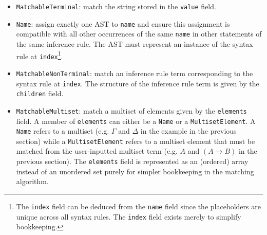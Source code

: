 \begin{itemize}
    \item \lstinline{MatchableTerminal}: match the string stored in the \lstinline{value} field.
    \item \lstinline{Name}: assign exactly one AST to \lstinline{name} and ensure this assignment is compatible with all other occurrences of the same \lstinline{name} in other statements of the same inference rule. The AST must represent an instance of the syntax rule at \lstinline{index}\footnote{The \lstinline{index} field can be deduced from the \lstinline{name} field since the placeholders are unique across all syntax rules. The \lstinline{index} field exists merely to simplify bookkeeping.}.
    \item \lstinline{MatchableNonTerminal}: match an inference rule term corresponding to the syntax rule at \lstinline{index}. The structure of the inference rule term is given by the \lstinline{children} field.
    \item \lstinline{MatchableMultiset}: match a multiset of elements given by the \lstinline{elements} field. A member of \lstinline{elements} can either be a \lstinline{Name} or a \lstinline{MultisetElement}. A \lstinline{Name} refers to a multiset (e.g. $\Gamma$ and $\Delta$ in the example in the previous section) while a \lstinline{MultisetElement} refers to a multiset element that must be matched from the user-inputted multiset term (e.g. $A$ and $(A \to B)$ in the previous section). The \lstinline{elements} field is represented as an (ordered) array instead of an unordered set purely for simpler bookkeeping in the matching algorithm.
\end{itemize}
